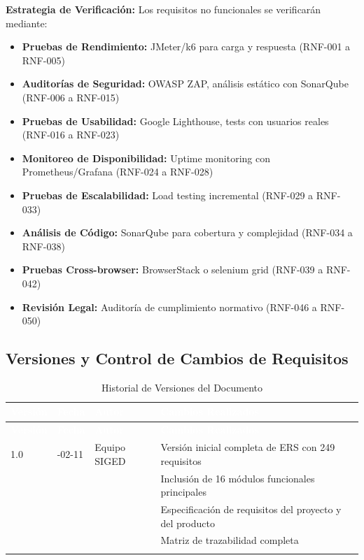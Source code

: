 \documentclass[12pt,a4paper]{article}
\begin{document}
\textbf{Estrategia de Verificación:}
Los requisitos no funcionales se verificarán mediante:
\begin{itemize}[noitemsep]
    \item \textbf{Pruebas de Rendimiento:} JMeter/k6 para carga y respuesta (RNF-001 a RNF-005)
    \item \textbf{Auditorías de Seguridad:} OWASP ZAP, análisis estático con SonarQube (RNF-006 a RNF-015)
    \item \textbf{Pruebas de Usabilidad:} Google Lighthouse, tests con usuarios reales (RNF-016 a RNF-023)
    \item \textbf{Monitoreo de Disponibilidad:} Uptime monitoring con Prometheus/Grafana (RNF-024 a RNF-028)
    \item \textbf{Pruebas de Escalabilidad:} Load testing incremental (RNF-029 a RNF-033)
    \item \textbf{Análisis de Código:} SonarQube para cobertura y complejidad (RNF-034 a RNF-038)
    \item \textbf{Pruebas Cross-browser:} BrowserStack o selenium grid (RNF-039 a RNF-042)
    \item \textbf{Revisión Legal:} Auditoría de cumplimiento normativo (RNF-046 a RNF-050)
\end{itemize}

\subsection{Versiones y Control de Cambios de Requisitos}

\begin{longtable}{|>{\centering\arraybackslash}p{1.2cm}|>{\centering\arraybackslash}p{1.5cm}|>{\raggedright\arraybackslash}p{2.5cm}|>{\raggedright\arraybackslash}p{6cm}|}
\hline
\rowcolor{headercolor}
\textcolor{white}{\textbf{Versión}} & \textcolor{white}{\textbf{Fecha}} & \textcolor{white}{\textbf{Autor}} & \textcolor{white}{\textbf{Cambios Realizados}} \\
\hline
\endfirsthead
\hline
\rowcolor{headercolor}
\textcolor{white}{\textbf{Versión}} & \textcolor{white}{\textbf{Fecha}} & \textcolor{white}{\textbf{Autor}} & \textcolor{white}{\textbf{Cambios Realizados}} \\
\hline
\endhead
\hline
\endlastfoot

1.0 & 2026-02-11 & Equipo SIGED & Versión inicial completa de ERS con 249 requisitos \\
\hline
\rowcolor{rowgray}
 &  &  & Inclusión de 16 módulos funcionales principales \\
\hline
 &  &  & Especificación de requisitos del proyecto y del producto \\
\hline
\rowcolor{rowgray}
 &  &  & Matriz de trazabilidad completa \\
\hline
\caption{Historial de Versiones del Documento}
\end{longtable}
\end{document}
